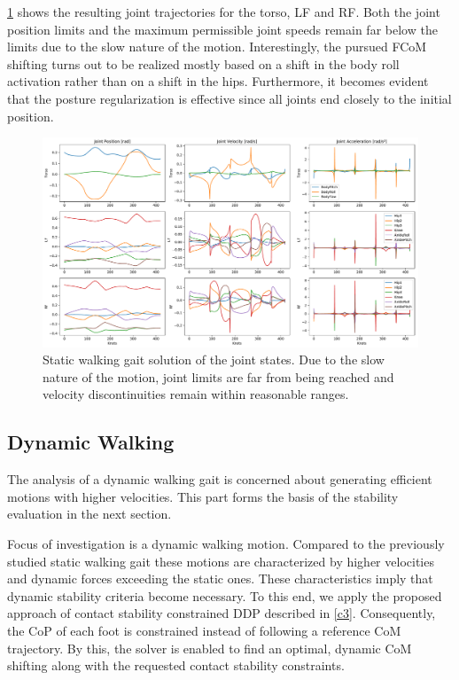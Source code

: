 \cref{fig:walkStatic_JointState} shows the resulting joint trajectories for the torso, \gls{LF} and \gls{RF}. Both the joint position limits and the maximum permissible joint speeds remain far below the limits due to the slow nature of the motion. Interestingly, the pursued \gls{FCoM} shifting turns out to be realized mostly based on a shift in the body roll activation rather than on a shift in the hips. Furthermore, it becomes evident that the posture regularization is effective since all joints end closely to the initial position.
\begin{figure}
\centering	
\includegraphics[width=1\textwidth]{fig/walkStatic/JointState}
\caption[Static walking gait solution of the joint states]{Static walking gait solution of the joint states. Due to the slow nature of the motion, joint limits are far from being reached and velocity discontinuities remain within reasonable ranges.}
\label{fig:walkStatic_JointState}
\end{figure} 

\subsection{Dynamic Walking}
The analysis of a dynamic walking gait is concerned about generating efficient motions with higher velocities. This part forms the basis of the stability evaluation in the next section.

Focus of investigation is a dynamic walking motion. Compared to the previously studied static walking gait these motions are characterized by higher velocities and dynamic forces exceeding the static ones. These characteristics imply that dynamic stability criteria become necessary. To this end, we apply the proposed approach of contact stability constrained DDP described in \cref{c3}. Consequently, the \gls{CoP} of each foot is constrained instead of following a reference \gls{CoM} trajectory. By this, the solver is enabled to find an optimal, dynamic \gls{CoM} shifting along with the requested contact stability constraints. 


